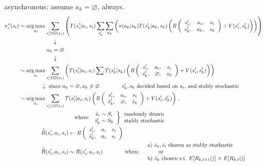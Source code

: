 asynchronous: assume $a_k = \varnothing$, always.
\begin{align*}
  \pi_i^\ast( s_i )
  & \sim \argmax_{a_i} \sum_{s_i^\prime \in G( s_i )} \left( T( s^\prime_i | a_i, s_i ) \sum_{s^\prime_k} \sum_{a_k} \left( \pi( a_k | s_k ) T( s^\prime_k | a_k, s_k ) \left( R\left( \begin{array}{ccc} s^\prime_i, & a_i, & s_i \\ s^\prime_k, & a_k, & s_k \end{array} \right) + V( s_i^\prime, s^\prime_k ) \right) \right) \right) \\
  & \qquad \qquad \qquad \downarrow \\
  & \qquad \qquad \quad a_k = \varnothing \\
  & \qquad \qquad \qquad \downarrow \\
  & \sim \argmax_{a_i} \sum_{s_i^\prime \in G( s_i )} \left( T( s^\prime_i | a_i, s_i ) \sum T( s^\prime_k | s_k ) \left(  R\left( \begin{array}{ccc} s^\prime_i, & a_i, & s_i \\ s^\prime_k, & \varnothing, & s_k \end{array} \right) + V( s_i^\prime, s^\prime_k ) \right) \right) \\
  & \qquad \qquad \downarrow \text{\ since\ } a_k = \varnothing, a_k \neq \varnothing \qquad \qquad s^\prime_k, s_k \text{\ decided\ based\ on\ }a_i\text{,\ and\ stably\ stochastic} \\
  & \sim \argmax_{a_i} \sum_{s_i^\prime \in G( s_i )} T( s^\prime_i | a_i, s_i )  \left(  R\left( \begin{array}{ccc} s^\prime_i, & a_i, & s_i \\ \bar{s}^\prime_k, & \varnothing, & \bar{s}_k \end{array} \right) + V( s_i^\prime, \bar{s}^\prime_k ) \right)\,,\\
  &
  \qquad \qquad \qquad \qquad \qquad\text{where\ } \left. \begin{array}{c} \bar{s}_i \sim S_i \\ \bar{s}^\prime_k \sim S_k \end{array}\right\}\begin{array}{l}\text{randomly\ drawn} \\ \text{stably\ stochastic}\end{array} \\
  & \qquad\qquad \bar{\bar{R}}( s^\prime_i, a_i, s_i ) \leftarrow
  R\left( \begin{array}{ccc} s^\prime_i, & a_i & s_i \\ \bar{s}^\prime_k, & a_i & s_i  \end{array}\right) \\
  & \qquad\qquad \bar{\bar{R}}( s^\prime_i, a_i, s_i ) \sim R( s^\prime_i, a_i, s_i ) 
  \qquad\qquad \textrm{when:}\quad \begin{array}{l}\text{a)\ }\bar{s}_k, \bar{s}_i\text{\ chosen\ as\ stably\ stochastic} \\
    \qquad \text{or} \\
 \text{b)\ }\bar{s}_k \text{\ chosen\ s.t.\ }E[R_{k,t+1}()]>E[R_{k,t}()]
  \end{array}
\end{align*}

